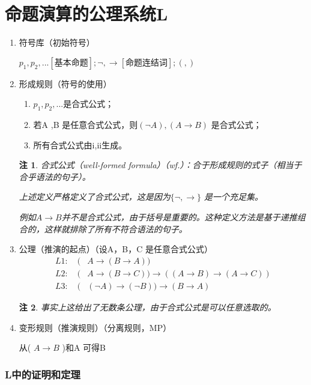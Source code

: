 \documentclass[12pt,onecolumn,a4paper]{book}
\newtheorem*{note}{注}
\numberwithin{table}{subsection}
\numberwithin{equation}{subsection}
\begin{document}
\section{命题演算的公理系统L}

\begin{enumerate}[itemsep=0pt,parsep=0pt]
    \item 符号库（初始符号）
    
    $p_1 ,p_2 ,...[\text{基本命题}];\neg,\rightarrow [\text{命题连结词}];( ,)$
    \item 形成规则（符号的使用）
    \begin{enumerate}[itemsep=0pt,parsep=0pt,label=\roman*]
        \item $p_1 ,p_2 ,...$是合式公式；
        \item 若A ,B 是任意合式公式，则$( \neg A ), ( A \rightarrow B )$ 是合式公式；
        \item 所有合式公式由i,ii生成。
    \end{enumerate}
    \begin{note}
        合式公式（well-formed formula）（wf.）：合于形成规则的式子（相当于合乎语法的句子）。

        上述定义严格定义了合式公式，这是因为$\{\neg ,  \rightarrow \}$ 是一个充足集。

        例如$A \rightarrow B$并不是合式公式，由于括号是重要的。这种定义方法是基于递推组合的，这样就排除了所有不符合语法的句子。
    \end{note}
    \item 公理（推演的起点）（设A，B，C 是任意合式公式）
    \begin{align}
        L1: \quad (& A \rightarrow ( B \rightarrow A )) \\
        L2: \quad (& A \rightarrow ( B \rightarrow C ))\rightarrow (( A \rightarrow B )\rightarrow ( A \rightarrow C )) \\
        L3: \quad (& (\neg A )\rightarrow ( \neg B ))\rightarrow ( B \rightarrow A )
    \end{align}
    \begin{note}
        事实上这给出了无数条公理，由于合式公式是可以任意选取的。
    \end{note}
    \item 变形规则（推演规则）（分离规则，MP）
    
    从( $A \rightarrow B$ )和A 可得B
\end{enumerate}

\subsubsection*{L中的\textbf{证明}和\textbf{定理}}
\end{document}
